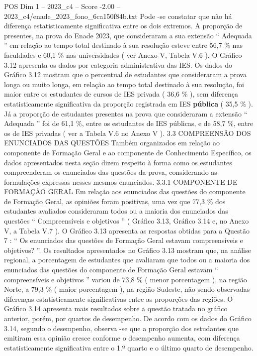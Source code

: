 \begin{textsample}{POS Dim 1 – 2023\_c4 – Score -2.00 – 2023\_c4/enade\_2023\_fono\_6ca150f84b.txt}
Pode -se constatar que não há diferença estatisticamente significativa entre os dois extremos.
A proporção de presentes, na prova do Enade 2023, que consideraram a sua extensão “ Adequada ” em relação ao tempo total destinado à sua resolução esteve entre 56,7 \% nas faculdades e 60,1 \% nas universidades ( ver Anexo V, Tabela V.6 ).
O Gráfico 3.12 apresenta os dados por categoria administrativa das IES.
Os dados do Gráfico 3.12 mostram que o percentual de estudantes que consideraram a prova longa ou muito longa, em relação ao tempo total destinado à sua resolução, foi maior entre os estudantes de cursos de IES privada ( 36,6 \% ), sem diferença estatisticamente significativa da proporção registrada em IES \textbf{pública} ( 35,5 \% ).
Já a proporção de estudantes presentes na prova que consideraram a extensão “ Adequada ” foi de 61,1 \%, entre os estudantes de IES públicas, e de 58,7 \%, entre os de IES privadas ( ver a Tabela V.6 no Anexo V ). 3.3 COMPREENSÃO DOS ENUNCIADOS DAS QUESTÕES Também organizados em relação ao componente de Formação Geral e ao componente de Conhecimento Específico, os dados apresentados nesta seção dizem respeito à forma como os estudantes compreenderam os enunciados das questões da prova, considerando as formulações expressas nesses mesmos enunciados. 3.3.1 COMPONENTE DE FORMAÇÃO GERAL Em relação aos enunciados das questões do componente de Formação Geral, as opiniões foram positivas, uma vez que 77,3 \% dos estudantes avaliados consideraram todos ou a maioria dos enunciados das questões “ Compreensíveis e objetivos ” ( Gráfico 3.13, Gráfico 3.14 e, no Anexo V, a Tabela V.7 ).
O Gráfico 3.13 apresenta as respostas obtidas para a Questão 7 : “ Os enunciados das questões de Formação Geral estavam compreensíveis e objetivos? ”.
Os resultados apresentados no Gráfico 3.13 mostram que, na análise regional, a porcentagem de estudantes que avaliaram que todos ou a maioria dos enunciados das questões do componente de Formação Geral estavam “ compreensíveis e objetivos ” variou de 73,8 \% ( menor porcentagem ), na região Norte, a 79,3 \% ( maior porcentagem ), na região Sudeste, não sendo observadas diferenças estatisticamente significativas entre as proporções das regiões.
O Gráfico 3.14 apresenta mais resultados sobre a questão tratada no gráfico anterior, porém, por quartos de desempenho.
De acordo com os dados do Gráfico 3.14, segundo o desempenho, observa -se que a proporção dos estudantes que emitiram essa opinião cresce conforme o desempenho aumenta, com diferença estatisticamente significativa entre o 1.º quarto e o último quarto de desempenho.

\end{textsample}
